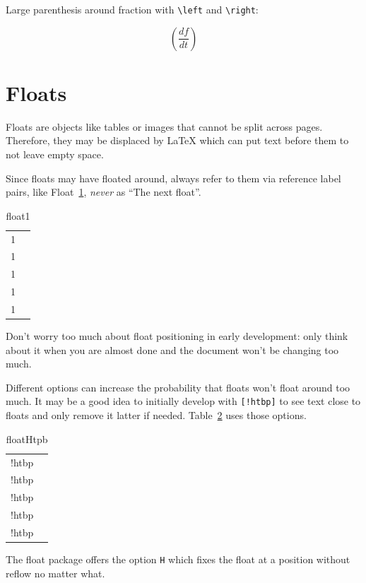 \documentclass[12pt]{article}
\begin{document}
  Large parenthesis around fraction with \lstinline|\left| and \lstinline|\right|:

  \[ \left(\frac{df}{dt}\right) \]

\section{Floats}\label{floats}

  Floats are objects like tables or images that cannot be split across pages.
  Therefore, they may be displaced by LaTeX which can put text before them to
  not leave empty space.

  Since floats may have floated around, always refer to them via reference label pairs,
  like Float~\ref{float1}, \emph{never} as ``The next float''.

  \begin{table}
    \begin{tabular}{cc}
      1 \\ 1 \\ 1 \\ 1 \\ 1 \\
    \end{tabular}
    \caption{float1}
    \label{float1}
  \end{table}

  Don't worry too much about float positioning in early development: only think about
  it when you are almost done and the document won't be changing too much.

  Different options can increase the probability that floats won't float around too much.
  It may be a good idea to initially develop with \lstinline|[!htbp]| to see text close to floats
  and only remove it latter if needed. Table~\ref{floatHtpb} uses those options.

  \begin{table}
    \begin{tabular}{cc}
      !htbp \\ !htbp \\ !htbp \\ !htbp \\ !htbp \\
    \end{tabular}
    \caption{floatHtpb}
    \label{floatHtpb}
  \end{table}

  The float package offers the option \lstinline|H| which fixes the float at a position without reflow no matter what.
\end{document}
